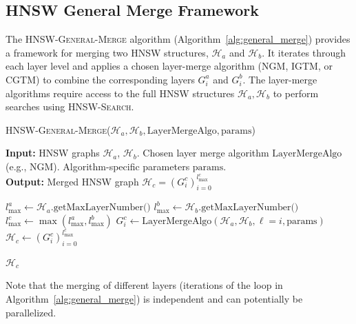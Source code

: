 \documentclass{article}
\begin{document}
\subsection{HNSW General Merge Framework}

The \textsc{HNSW-General-Merge} algorithm (Algorithm~\ref{alg:general_merge}) provides a framework for merging two HNSW structures, $\mathcal{H}_a$ and $\mathcal{H}_b$. It iterates through each layer level and applies a chosen layer-merge algorithm (\textsc{NGM}, \textsc{IGTM}, or \textsc{CGTM}) to combine the corresponding layers $G^a_i$ and $G^b_i$. The layer-merge algorithms require access to the full HNSW structures $\mathcal{H}_a, \mathcal{H}_b$ to perform searches using \textsc{HNSW-Search}.


\begin{algorithm}
\caption{\textsc{HNSW-General-Merge}($\mathcal{H}_a, \mathcal{H}_b, \text{LayerMergeAlgo}, \text{params}$)}\label{alg:general_merge}
\textbf{Input:} HNSW graphs $\mathcal{H}_a$, $\mathcal{H}_b $. Chosen layer merge algorithm $\text{LayerMergeAlgo}$ (e.g., \textsc{NGM}). Algorithm-specific parameters $\text{params}$. \\
\textbf{Output:} Merged HNSW graph $\mathcal{H}_c = (G^c_i)_{i=0}^{l_{\max}^c}$
\begin{algorithmic}[1]
\State $l_{\max}^a \gets \mathcal{H}_a.\text{getMaxLayerNumber()}$
\State $l_{\max}^b \gets \mathcal{H}_b.\text{getMaxLayerNumber()}$
\State $l_{\max}^c \gets \max(l_{\max}^a, l_{\max}^b)$
     
    \State $G^c_i \gets \text{LayerMergeAlgo}(\mathcal{H}_a, \mathcal{H}_b, \ell=i, \text{params})$ 
\EndFor
\State $\mathcal{H}_c \gets (G^c_i)_{i=0}^{l_{\max}^c}$ %

\State \Return $\mathcal{H}_c$
\end{algorithmic}
\end{algorithm}

Note that the merging of different layers (iterations of the loop in Algorithm~\ref{alg:general_merge}) is independent and can potentially be parallelized.

\end{document}
